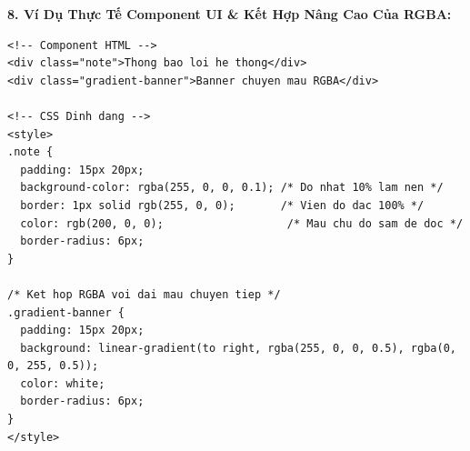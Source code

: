 \documentclass[11pt,oneside]{book}
\begin{document}
\begin{browserWindow}
\begin{tcolorbox}
\begin{tcolorbox}
\begin{minipage}{\linewidth}
      \vspace{8pt}
      \begin{flushright}
        \hspace{6pt}%
      \end{flushright}
    \end{minipage}
  \end{tcolorbox}
  \vspace{14pt}
\end{tcolorbox}
\end{browserWindow}

\textbf{8. Ví Dụ Thực Tế Component UI \& Kết Hợp Nâng Cao Của RGBA:}

\begin{codeWindow}
\begin{lstlisting}[language=HTML5]
<!-- Component HTML -->
<div class="note">Thong bao loi he thong</div>
<div class="gradient-banner">Banner chuyen mau RGBA</div>

<!-- CSS Dinh dang -->
<style>
.note {
  padding: 15px 20px;
  background-color: rgba(255, 0, 0, 0.1); /* Do nhat 10% lam nen */
  border: 1px solid rgb(255, 0, 0);       /* Vien do dac 100% */
  color: rgb(200, 0, 0);                   /* Mau chu do sam de doc */
  border-radius: 6px;
}

/* Ket hop RGBA voi dai mau chuyen tiep */
.gradient-banner {
  padding: 15px 20px;
  background: linear-gradient(to right, rgba(255, 0, 0, 0.5), rgba(0, 0, 255, 0.5));
  color: white;
  border-radius: 6px;
}
</style>
\end{lstlisting}
\end{codeWindow}
\end{document}
